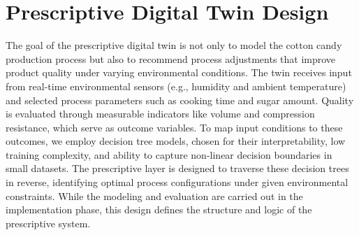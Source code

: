 \section{Prescriptive Digital Twin Design}
The goal of the prescriptive digital twin is not only to model the cotton candy production process but also to recommend process adjustments that improve product quality under varying environmental conditions. The twin receives input from real-time environmental sensors (e.g., humidity and ambient temperature) and selected process parameters such as cooking time and sugar amount. Quality is evaluated through measurable indicators like volume and compression resistance, which serve as outcome variables. To map input conditions to these outcomes, we employ decision tree models, chosen for their interpretability, low training complexity, and ability to capture non-linear decision boundaries in small datasets. The prescriptive layer is designed to traverse these decision trees in reverse, identifying optimal process configurations under given environmental constraints. While the modeling and evaluation are carried out in the implementation phase, this design defines the structure and logic of the prescriptive system.






